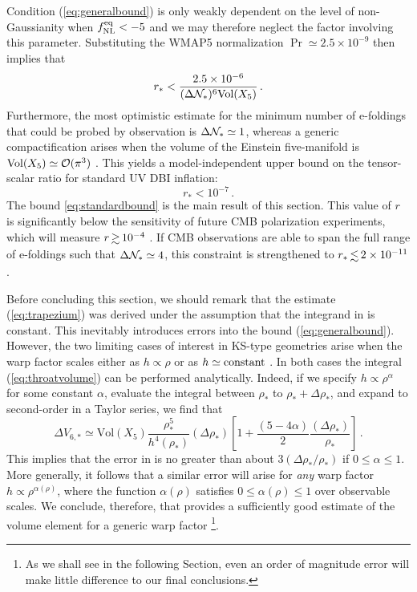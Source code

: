 Condition (\ref{eq:generalbound}) is 
only weakly dependent on the level of non-Gaussianity 
when $f_{\mathrm{NL}}^{\mathrm{eq}} < -5$ and we may therefore neglect the 
factor involving this parameter. 
Substituting the WMAP5 normalization 
$\Pr \simeq 2.5 \times 10^{-9}$ then implies that
%  
\begin{equation}
\label{eq:upperbound}
r_{*} < \frac{2.5\times 10^{-6}}{( \Delta \mathcal{N}_*)^6 \mathrm{Vol}(X_5)} \,.
\end{equation}
% 
Furthermore, the most optimistic 
estimate for the minimum number of e-foldings that could be 
probed by observation is $\Delta \mathcal{N}_{*} \simeq 1$, whereas
a generic compactification arises when 
the volume of the Einstein five-manifold is $\mathrm{Vol}(X_5) 
\simeq {\cal{O}} (\pi^3)$ \cite{ks}. This yields a model-independent 
upper bound on the tensor-scalar ratio for standard UV DBI inflation:
%    
\begin{equation}
\label{eq:standardbound}
r_* < 10^{-7} \,.
\end{equation}
% 
The bound \eqref{eq:standardbound} is the main result of this section.
This value of $r$ is significantly below the sensitivity 
of future CMB polarization experiments, which will measure 
${r} \, {\gsim} \, 10^{-4}$ \cite{Baumann:2008aq,vpj}. 
If CMB  
observations are able to span the full range of e-foldings such that
$\Delta \mathcal{N}_* \simeq 4$, this constraint is strengthened to 
${r_*} \, {\lsim} \, {2 \times 10^{-11}}$.


Before concluding this section, we should remark that 
the estimate (\ref{eq:trapezium}) was derived under the assumption  
that the integrand in   
is constant. This inevitably introduces errors into the bound
(\ref{eq:generalbound}). However, the two limiting cases of interest 
in KS-type geometries arise 
when the warp factor scales either as $h \propto \rho$
or as $h \simeq {\rm constant}$ \cite{ks,kt}. In both cases
the integral (\ref{eq:throatvolume}) can be performed analytically. 
Indeed, if we specify $h \propto \rho^{\alpha}$ for some constant $\alpha$,  
evaluate the integral between $\rho_{*}$ 
to $\rho_{*}+\Delta \rho_{*}$, and expand to second-order in a 
Taylor series, we find that  
% 
\begin{equation}
\label{eq:limits}
\Delta V_{6,*} \simeq \mathrm{Vol}(X_5) \frac{\rho^5_{*}}{h^{4} 
(\rho_{*} )}(\Delta \rho_*) 
\left[ 1 +\frac{(5-4 \alpha )}{2} 
\frac{(\Delta \rho_*)}{\rho_{*}} \right]  \,.
\end{equation}
% 
This implies that the error in  
is no greater than 
about $3 (\Delta \rho_* / \rho_*)$ if  
$0 \le \alpha \le 1$. More generally, it follows that a similar
error will arise for {\em any} warp factor 
$h \propto \rho^{\alpha (\rho )}$, where the function 
$\alpha (\rho)$ satisfies $0 \le \alpha (\rho ) \le 1$ 
over observable scales. 
We conclude, therefore, that  
provides a sufficiently good estimate of the volume element  
for a generic warp factor
\footnote{As we shall see in the following Section, 
even an order of magnitude error will make little 
difference to our final conclusions.}.  
% 
% 
% 
% 
